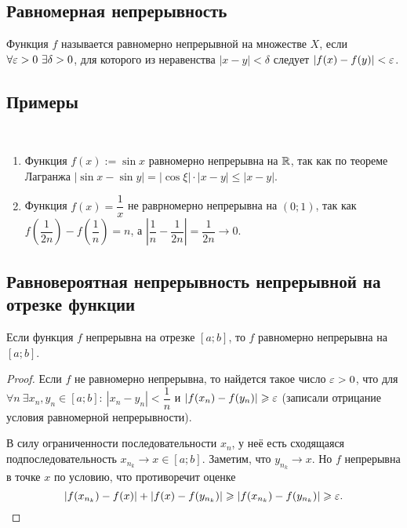 \documentclass[a4paper]{article}
\theoremstyle{named}
\begin{document}
        \subsection{Равномерная непрерывность}

        \begin{definition*}
            Функция $f$ называется равномерно непрерывной на множестве $X$, если $\forall \varepsilon > 0 \ \exists \delta  > 0$, для которого из неравенства $|x - y| < \delta$ следует $|f(x) - f(y)| < \varepsilon$.
        \end{definition*}

        \subsection{Примеры}

        \begin{example*}~
            
            \begin{enumerate}
            \item
                Функция $f(x) := \sin x$ равномерно непрерывна на $\mathbb{R}$, так как по теореме Лагранжа $|\sin x - \sin y| = |\cos \xi| \cdot |x - y| \leq |x - y|$.

            \item
                Функция $f(x) = \dfrac{1}{x}$ не раврномерно непрерывна на $(0; 1)$, так как $f \left(\dfrac{1}{2n}\right) - f \left(\dfrac{1}{n}\right) = n$, а $\left|\dfrac{1}{n} - \dfrac{1}{2n}\right| = \dfrac{1}{2n} \to 0$.
            \end{enumerate}
        \end{example*}

        \subsection{Равновероятная непрерывность непрерывной на отрезке функции}

        \begin{theorem*}
            Если функция $f$ непрерывна на отрезке $[a; b]$, то $f$ равномерно непрерывна на $[a; b]$.
        \end{theorem*}

        \begin{proof}
            Если $f$ не равномерно непрерывна, то найдется такое число $\varepsilon > 0$, что для $\forall n \ \exists x_n, y_n \in [a; b]: \ |x_n - y_n| < \dfrac{1}{n}$ и $|f(x_n) - f(y_n)| \geqslant \varepsilon$ (записали отрицание условия равномерной непрерывности). 

            В силу ограниченности последовательности $x_n$, у неё есть сходящаяся подпоследовательность $x_{n_k} \to x \in [a; b]$. Заметим, что $y_{n_k} \to x$. Но $f$ непрерывна в точке $x$ по условию, что противоречит оценке
            \begin{equation*}
                |f(x_{n_k}) - f(x)| + |f(x) - f(y_{n_k})| \geqslant |f(x_{n_k}) - f(y_{n_k})| \geqslant \varepsilon.
            \end{equation*}
        \end{proof}
\end{document}
